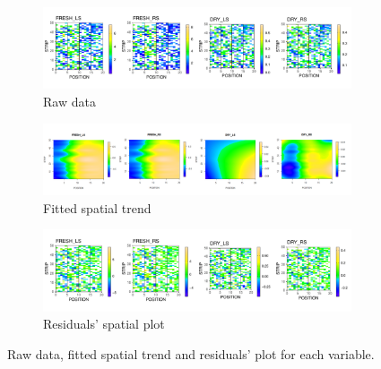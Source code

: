 \begin{figure}
	\begin{subfigure}[t]{\textwidth}
		\centering
		\includegraphics[width = \textwidth]{../../Figures/rawData_plot.pdf}
		\caption{Raw data}
	\end{subfigure}
	
	\begin{subfigure}[t]{\textwidth}
		\centering
		\includegraphics[width = \textwidth]{../../Figures/fitted.png}
		\caption{Fitted spatial trend}
	\end{subfigure}
	
	\begin{subfigure}[t]{\textwidth}
		\centering
		\includegraphics[width = \textwidth]{../../Figures/residuals_plot.pdf}
		\caption{Residuals' spatial plot}
	\end{subfigure}
	\caption{Raw data, fitted spatial trend and residuals' plot for each variable.}
	\label{fig:spats_model_results}
\end{figure}

